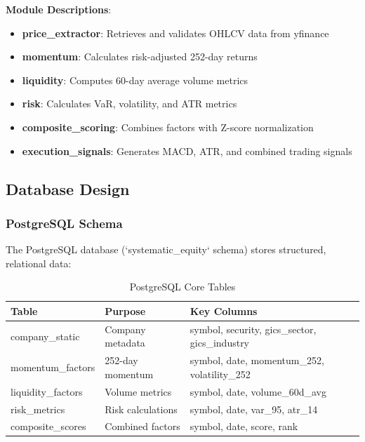 \documentclass[11pt, a4paper, twoside]{article}
\begin{document}
\textbf{Module Descriptions}:

\begin{itemize}
    \item \textbf{price\_extractor}: Retrieves and validates OHLCV data from yfinance
    \item \textbf{momentum}: Calculates risk-adjusted 252-day returns
    \item \textbf{liquidity}: Computes 60-day average volume metrics
    \item \textbf{risk}: Calculates VaR, volatility, and ATR metrics
    \item \textbf{composite\_scoring}: Combines factors with Z-score normalization
    \item \textbf{execution\_signals}: Generates MACD, ATR, and combined trading signals
\end{itemize}

\subsection{Database Design}

\subsubsection{PostgreSQL Schema}

The PostgreSQL database (`systematic_equity` schema) stores structured, relational data:

\begin{table}[H]
    \centering
    \caption{PostgreSQL Core Tables}
    \label{tab:postgres-schema}
    \begin{tabular}{|l|l|p{4cm}|}
        \hline
        \textbf{Table} & \textbf{Purpose} & \textbf{Key Columns} \\
        \hline
        company\_static & Company metadata & symbol, security, gics\_sector, gics\_industry \\
        \hline
        momentum\_factors & 252-day momentum & symbol, date, momentum\_252, volatility\_252 \\
        \hline
        liquidity\_factors & Volume metrics & symbol, date, volume\_60d\_avg \\
        \hline
        risk\_metrics & Risk calculations & symbol, date, var\_95, atr\_14 \\
        \hline
        composite\_scores & Combined factors & symbol, date, score, rank \\
        \hline
    \end{tabular}
\end{table}
\end{document}

